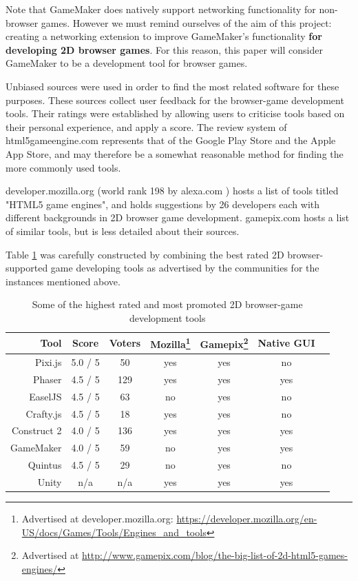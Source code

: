 \documentclass[bsc,frontabs,twoside,singlespacing,parskip,deptreport]{infthesis}     %
\begin{document}
Note that GameMaker does natively support networking functionality for non-browser games. However we must remind ourselves of the aim of this project: creating a networking extension to improve GameMaker's functionality \textbf{for developing 2D browser games}. For this reason, this paper will consider GameMaker to be a development tool for browser games.

Unbiased sources were used in order to find the most related software for these purposes. These sources collect user feedback for the browser-game development tools. Their ratings were established by allowing users to criticise tools based on their personal experience, and apply a score. The review system of html5gameengine.com \cite{html5_gamedev_tools} represents that of the Google Play Store\cite{Google_Play_Store} and the Apple App Store\cite{Apple_App_Store}, and may therefore be a somewhat reasonable method for finding the more commonly used tools.

developer.mozilla.org \cite{html5_mozilla} (world rank 198 by alexa.com \cite{alexa_ranking}) hosts a list of tools titled "HTML5 game engines", and holds suggestions by 26 developers each with different backgrounds in 2D browser game development. gamepix.com \cite{gamepix_engines} hosts a list of similar tools, but is less detailed about their sources.

Table \ref{table:Related_Tools} was carefully constructed by combining the best rated 2D browser-supported game developing tools as advertised by the communities for the instances mentioned above.

\begin{savenotes}
\begin{table}
\centering
  \begin{tabular}{ | r || c | c | c | c | c | c | }
  	\hline
  	\textbf{Tool}			& \textbf{Score}		& \textbf{Voters}& \textbf{Mozilla}\footnote{Advertised at developer.mozilla.org: \url{https://developer.mozilla.org/en-US/docs/Games/Tools/Engines\_and\_tools}} 	& \textbf{Gamepix}\footnote{Advertised at \url{http://www.gamepix.com/blog/the-big-list-of-2d-html5-games-engines/}} 	& \textbf{Native GUI}\\ \hline\hline
    Pixi.js			& 5.0 / 5	& 50	& yes	& yes	& no	\\ \hline
    Phaser			& 4.5 / 5	& 129	& yes	& yes	& yes	\\ \hline
    EaselJS			& 4.5 / 5	& 63	& no	& yes	& no	\\ \hline
    Crafty.js		& 4.5 / 5	& 18	& yes	& yes	& no	\\ \hline
    Construct 2		& 4.0 / 5	& 136	& yes	& yes	& yes	\\ \hline
    GameMaker		& 4.0 / 5	& 59	& no	& yes	& yes	\\ \hline
   	Quintus			& 4.5 / 5	& 29	& no	& yes	& no	\\ \hline
  	Unity			& n/a		& n/a	& yes	& yes	& yes	\\ \hline
  \end{tabular}
  \caption{Some of the highest rated and most promoted 2D browser-game development tools}
  \label{table:Related_Tools}
\end{table}%
\end{savenotes}
\end{document}
